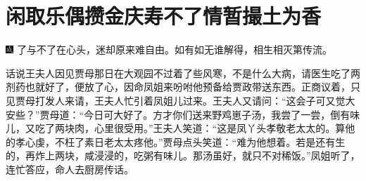 

\chapter{闲取乐偶攒金庆寿\hspace{.5em}不了情暂撮土为香}


{\includegraphics[width=3mm]{../Images/00005} \kaishu 了与不了在心头，迷却原来难自由。如有如无谁解得，相生相灭第传流。}

话说王夫人因见贾母那日在大观园不过着了些风寒，不是什么大病，请医生吃了两剂药也就好了，便放了心，因命凤姐来吩咐他预备给贾政带送东西。正商议着，只见贾母打发人来请，王夫人忙引着凤姐儿过来。王夫人又请问：“这会子可又觉大安些？”贾母道：“今日可大好了。方才你们送来野鸡崽子汤，我尝了一尝，倒有味儿，又吃了两块肉，心里很受用。”王夫人笑道：“这是凤丫头孝敬老太太的。算他的孝心虔，不枉了素日老太太疼他。”贾母点头笑道：“难为他想着。若是还有生的，再炸上两块，咸浸浸的，吃粥有味儿。那汤虽好，就只不对稀饭。”凤姐听了，连忙答应，命人去厨房传话。

